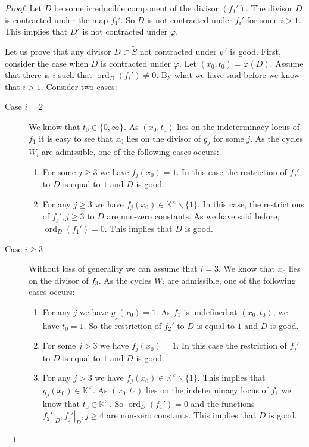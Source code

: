 \documentclass[12pt]{extarticle}
\def\mb{\mathbb}
\def\k{\mb K}
\def\ph{\varphi}
\def\t{\times}
\def\wt{\widetilde}
\def\bs{\backslash}
\newcommand{\res}[2]{\left.{#1}\right|_{#2}}
\DeclareMathOperator{\ord}{ord}
\begin{document}
\begin{proof}
 Let $D$ be some irreducible component of the divisor $(f_1')$. The divisor $D$ is contracted under the map $f_1'$. So $D$ is not contracted under $f_i'$ for some $i>1$. This implies that $D'$ is not contracted under $\ph$. 

Let us prove that any divisor $D\subset \wt S$ not contracted under $\psi'$ is good. First, consider the case when $D$ is contracted under $\ph$. Let $(x_0,t_0)=\ph(D)$.  Assume that there is $i$ such that $\ord_D(f_i')\ne 0$. By what we have said before we know that $i>1$. Consider two cases:
\begin{description}
\item[Case $i=2$] We know that $t_0\in\{0,\infty\}$. As $(x_0,t_0)$ lies on the indeterminacy locus of $f_1$ it is easy to see that $x_0$ lies on the divisor of $g_j$ for some $j$. As the cycles $W_i$ are admissible, one of the following cases occurs:
\begin{enumerate}
    \item For some $j\geq 3$ we have $f_j(x_0)=1$. In this case the restriction of $f_j'$ to $D$ is equal to $1$ and $D$ is good.
    \item For any $j\geq 3$ we have $f_j(x_0)\in \k^\t\bs\{1\}$. In this case, the restrictions of $f_j', j\geq 3$ to $D$ are non-zero constants. As we have said before, $\ord_{D}(f_1')=0$. This implies that $D$ is good.
\end{enumerate}
    \item[Case $i\geq 3$] Without loss of generality we can assume that $i=3$. We know that $x_0$ lies on the divisor of $f_3$. As the cycles $W_i$ are admissible, one of the following cases occurs:
    \begin{enumerate}
    \item For any $j$ we have $g_j(x_0)=1$. As $f_1$ is undefined at $(x_0, t_0)$, we have $t_0=1$. So the restriction of $f_2'$ to $D$ is equal to $1$ and $D$ is good.
        \item For some $j>3$ we have $f_j(x_0)=1$. In this case the restriction of $f_j'$ to $D$ is equal to $1$ and $D$ is good.
        \item For any $j>3$ we have $f_j(x_0)\in \k^\t\bs\{1\}$. This implies that $g_j(x_0)\in\k^\t$. As $(x_0,t_0)$ lies on the indeterminacy locus of $f_1$ we know that $t_0\in\k^\t$. So $\ord_D(f_1')=0$ and the functions $\res{f_2'}{D}, \res{f_j'}{D}, j\geq 4$ are non-zero constants. This implies that $D$ is good.
    \end{enumerate}
\end{description}


\end{proof}
\end{document}
